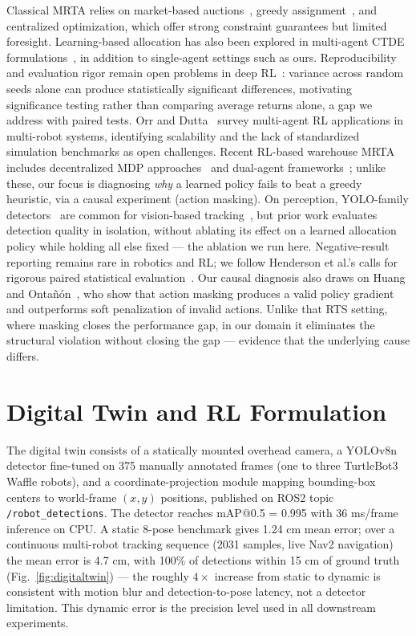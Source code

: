 \documentclass[conference]{IEEEtran}
\begin{document}
Classical MRTA relies on market-based auctions~\cite{dias2006market}, greedy assignment~\cite{gerkey2004formal}, and centralized optimization, which offer strong constraint guarantees but limited foresight. Learning-based allocation has also been explored in multi-agent CTDE formulations~\cite{lowe2017multi}, in addition to single-agent settings such as ours. Reproducibility and evaluation rigor remain open problems in deep RL~\cite{henderson2018deep}: variance across random seeds alone can produce statistically significant differences, motivating significance testing rather than comparing average returns alone, a gap we address with paired tests. Orr and Dutta~\cite{orr2023survey} survey multi-agent RL applications in multi-robot systems, identifying scalability and the lack of standardized simulation benchmarks as open challenges. Recent RL-based warehouse MRTA includes decentralized MDP approaches~\cite{agrawal2022dcmrta} and dual-agent frameworks~\cite{pal2025together}; unlike these, our focus is diagnosing \emph{why} a learned policy fails to beat a greedy heuristic, via a causal experiment (action masking). On perception, YOLO-family detectors~\cite{yolov8} are common for vision-based tracking~\cite{ahmed2021topview}, but prior work evaluates detection quality in isolation, without ablating its effect on a learned allocation policy while holding all else fixed --- the ablation we run here. Negative-result reporting remains rare in robotics and RL; we follow Henderson et al.'s calls for rigorous paired statistical evaluation~\cite{henderson2018deep}. Our causal diagnosis also draws on Huang and Ontañón~\cite{huang2022masking}, who show that action masking produces a valid policy gradient and outperforms soft penalization of invalid actions. Unlike that RTS setting, where masking closes the performance gap, in our domain it eliminates the structural violation without closing the gap --- evidence that the underlying cause differs.

\section{Digital Twin and RL Formulation}

The digital twin consists of a statically mounted overhead camera, a YOLOv8n detector fine-tuned on 375 manually annotated frames (one to three TurtleBot3 Waffle robots), and a coordinate-projection module mapping bounding-box centers to world-frame $(x,y)$ positions, published on ROS2 topic \texttt{/robot\_detections}. The detector reaches mAP@0.5 = 0.995 with 36 ms/frame inference on CPU. A static 8-pose benchmark gives 1.24 cm mean error; over a continuous multi-robot tracking sequence (2031 samples, live Nav2 navigation) the mean error is 4.7 cm, with 100\% of detections within 15 cm of ground truth (Fig.~\ref{fig:digitaltwin}) --- the roughly $4\times$ increase from static to dynamic is consistent with motion blur and detection-to-pose latency, not a detector limitation. This dynamic error is the precision level used in all downstream experiments.
\end{document}
